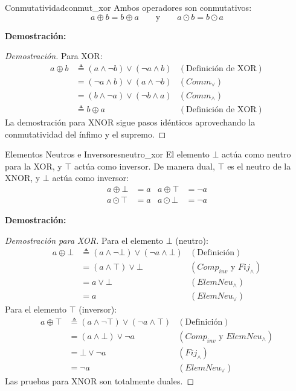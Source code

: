 \documentclass[12pt,a4paper]{article}
\newcommand{\desplegable}[2]{%
  \par\vspace{1ex}\noindent
  \textbf{Demostración:}
  \vspace{1ex}
  
  #2
  \par\vspace{1ex}
}
\begin{document}
\begin{teorema}{Conmutatividad}{conmut_xor}
Ambos operadores son conmutativos:
\[ a \oplus b = b \oplus a \qquad \text{y} \qquad a \odot b = b \odot a \]
\end{teorema}
\desplegable{proof_conmut_xor}{
\begin{proof}[Demostración]
Para XOR:
\begin{align*}
    a \oplus b &\triangleq (a \wedge \neg b) \vee (\neg a \wedge b) & (\text{Definición de XOR}) \\
               &= (\neg a \wedge b) \vee (a \wedge \neg b) & (Comm_\vee) \\
               &= (b \wedge \neg a) \vee (\neg b \wedge a) & (Comm_\wedge) \\
               &\triangleq b \oplus a & (\text{Definición de XOR})
\end{align*}
La demostración para XNOR sigue pasos idénticos aprovechando la conmutatividad del ínfimo y el supremo.
\end{proof}
}

\begin{teorema}{Elementos Neutros e Inversores}{neutro_xor}
El elemento $\bot$ actúa como neutro para la XOR, y $\top$ actúa como inversor. De manera dual, $\top$ es el neutro de la XNOR, y $\bot$ actúa como inversor:
\begin{align*}
    a \oplus \bot &= a & a \oplus \top &= \neg a \\
    a \odot \top &= a & a \odot \bot &= \neg a
\end{align*}
\end{teorema}
\desplegable{proof_neutro_xor}{
\begin{proof}[Demostración para XOR]
Para el elemento $\bot$ (neutro):
\begin{align*}
    a \oplus \bot &\triangleq (a \wedge \neg \bot) \vee (\neg a \wedge \bot) & (\text{Definición}) \\
                  &= (a \wedge \top) \vee \bot & (Comp_{inv} \text{ y } Fij_\wedge) \\
                  &= a \vee \bot & (ElemNeu_\wedge) \\
                  &= a & (ElemNeu_\vee)
\end{align*}
Para el elemento $\top$ (inversor):
\begin{align*}
    a \oplus \top &\triangleq (a \wedge \neg \top) \vee (\neg a \wedge \top) & (\text{Definición}) \\
                  &= (a \wedge \bot) \vee \neg a & (Comp_{inv} \text{ y } ElemNeu_\wedge) \\
                  &= \bot \vee \neg a & (Fij_\wedge) \\
                  &= \neg a & (ElemNeu_\vee)
\end{align*}
Las pruebas para XNOR son totalmente duales.
\end{proof}
}
\end{document}
